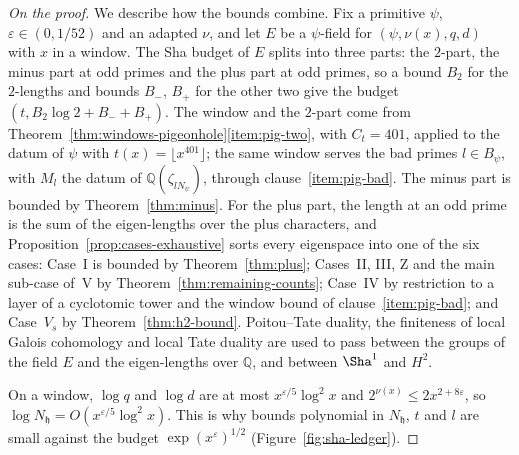 \documentclass[11pt]{amsbook}
\theoremstyle{plain}
\theoremstyle{definition}
\theoremstyle{remark}
\numberwithin{equation}{section}
\numberwithin{figure}{chapter}
\numberwithin{table}{chapter}
\newcommand{\Q}{\mathbb{Q}}
\newcommand{\eps}{\varepsilon}
\begin{document}
\begin{proof}[On the proof]
We describe how the bounds combine.
Fix a
primitive $\psi$, $\eps\in(0,1/52)$ and an adapted $\nu$, and let $E$
be a $\psi$-field for $(\psi,\nu(x),q,d)$ with $x$ in a window. The
Sha budget of $E$ splits into three parts: the $2$-part, the minus part
at odd primes and the plus part at odd primes, so a bound $B_2$ for
the $2$-lengths and bounds $B_-$, $B_+$ for the other two give the
budget $(t,B_2\log2+B_-+B_+)$. The window and the $2$-part come
from Theorem~\ref{thm:windows-pigeonhole}\ref{item:pig-two}, with
$C_t=401$, applied to the datum
of $\psi$ with $t(x)=\lfloor x^{401}\rfloor$; the same window serves
the bad primes $l\in B_\psi$, with $M_l$ the datum of
$\Q(\zeta_{lN_\psi})$, through clause~\ref{item:pig-bad}. The
minus part is bounded by Theorem~\ref{thm:minus}. For the plus part,
the length at an odd prime is the sum of the eigen-lengths over the
plus characters, and Proposition~\ref{prop:cases-exhaustive} sorts
every eigenspace into one of the six cases: Case~I is bounded by
Theorem~\ref{thm:plus}; Cases~II, III, Z and the
main sub-case of~V by Theorem~\ref{thm:remaining-counts}; Case~IV by
restriction to a layer of a cyclotomic tower and the window bound of
clause~\ref{item:pig-bad}; and Case~$V_s$ by
Theorem~\ref{thm:h2-bound}. Poitou--Tate duality, the finiteness of
local Galois cohomology and local Tate duality
\cite{Tate1963,Poitou1967} are used to pass between the groups of the
field $E$ and the eigen-lengths over $\Q$, and between $\Sha^1$ and
$H^2$.

On a window, $\log q$ and $\log d$ are at most $x^{\eps/5}\log^2x$
and $2^{\nu(x)}\le2x^{2+8\eps}$, so $\log N_{\mathfrak h}=O(x^{\eps/5}\log^2x)$.
This is why bounds polynomial in $N_{\mathfrak h}$, $t$ and $l$ are small
against
the budget $\exp(x^\eps)^{1/2}$ (Figure~\ref{fig:sha-ledger}).
\end{proof}
\end{document}
